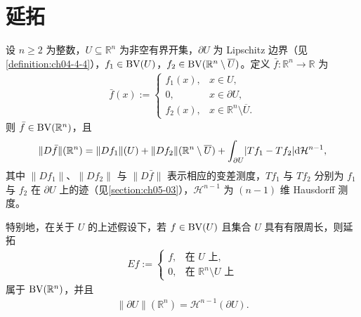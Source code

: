 \documentclass[../../main.tex]{subfiles}%
\begin{document}
\section{延拓}\label{section:ch05-04}

\begin{theorem}[$\BV$ 函数的延拓]\label{theorem:ch05-5-8}
设 $n\geqslant2$ 为整数，$U\subseteq\mathbb{R}^n$ 为非空有界开集，$\partial U$ 为 Lipschitz 边界（见\cref{definition:ch04-4-4}），$f_1\in\mathrm{BV}(U)$，$f_2\in\mathrm{BV}(\mathbb{R}^n\setminus\overline{U})$。定义 $\bar f:\mathbb{R}^n\to\mathbb{R}$ 为%
\begin{align*}
\bar f(x):=
\begin{cases}
f_1(x), & x\in U,\\
0, & x\in\partial U,\\
f_2(x), & x\in\mathbb{R}^n\setminus\overline{U}.
\end{cases}
\end{align*}
则 $\bar f\in\mathrm{BV}(\mathbb{R}^n)$，且
\begin{align*}
\lVert D\bar f\rVert(\mathbb{R}^n)=\lVert Df_1\rVert(U)+\lVert Df_2\rVert(\mathbb{R}^n\setminus\overline{U})+\int_{\partial U}\lvert Tf_1-Tf_2\rvert\mathrm{d}\mathcal{H}^{n-1},
\end{align*}
其中 $\lVert Df_1\rVert$、$\lVert Df_2\rVert$ 与 $\lVert D\bar f\rVert$ 表示相应的变差测度，$Tf_1$ 与 $Tf_2$ 分别为 $f_1$ 与 $f_2$ 在 $\partial U$ 上的迹（见\cref{section:ch05-03}），$\mathcal{H}^{n-1}$ 为 $(n-1)$ 维 Hausdorff 测度。%
\end{theorem}

\begin{remark}\label{remark:ch05-thm-5-8-零延拓}
特别地，在关于 $U$ 的上述假设下，若 $f\in\mathrm{BV}(U)$ 且集合 $U$ 具有有限周长，则延拓
\begin{align*}
Ef:=
\begin{cases}
f, & \text{在 }U\text{ 上},\\
0, & \text{在 }\mathbb{R}^n\setminus U\text{ 上}
\end{cases}
\end{align*}
属于 $\mathrm{BV}(\mathbb{R}^n)$，并且
\begin{align*}
\lVert\partial U\rVert(\mathbb{R}^n)=\mathcal{H}^{n-1}(\partial U).
\end{align*}
\end{remark}
\end{document}
